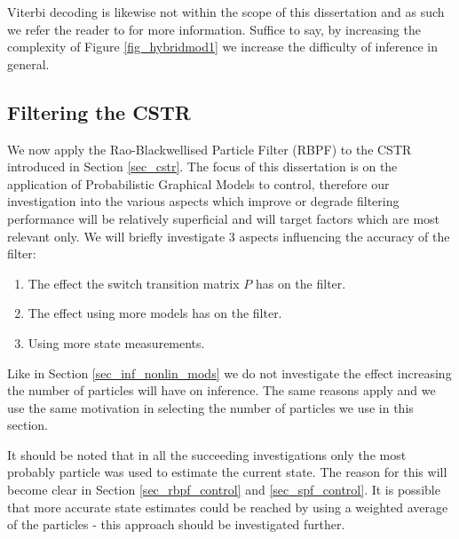 Viterbi decoding is likewise not within the scope of this dissertation and as such we refer the reader to \cite{murphy1} for more information. Suffice to say, by increasing the complexity of Figure \ref{fig_hybridmod1} we increase the difficulty of inference in general.

\subsection{Filtering the CSTR}
We now apply the Rao-Blackwellised Particle Filter (RBPF) to the CSTR introduced in Section \ref{sec_cstr}. The focus of this dissertation is on the application of Probabilistic Graphical Models to control, therefore our investigation into the various aspects which improve or degrade filtering performance will be relatively superficial and will target factors which are most relevant only. We will briefly investigate 3 aspects influencing the accuracy of the filter:
\begin{enumerate}
\item
The effect the switch transition matrix $P$ has on the filter.
\item
The effect using more models has on the filter.
\item
Using more state measurements.
\end{enumerate}
Like in Section \ref{sec_inf_nonlin_mods} we do not investigate the effect increasing the number of particles will have on inference. The same reasons apply and we use the same motivation in selecting the number of particles we use in this section.

It should be noted that in all the succeeding investigations only the most probably particle was used to estimate the current state. The reason for this will become clear in Section \ref{sec_rbpf_control} and \ref{sec_spf_control}. It is possible that more accurate state estimates could be reached by using a weighted average of the particles - this approach should be investigated further.

